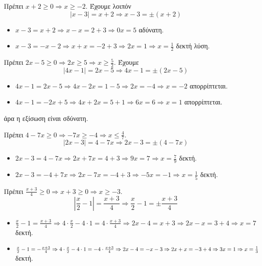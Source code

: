 \begin{alist}
\item Πρέπει $ x+2\geq 0\Rightarrow x\geq -2 $. Έχουμε λοιπόν 
\[ |x-3|=x+2\Rightarrow x-3=\pm(x+2) \]
\begin{itemize}
\item $ x-3=x+2\Rightarrow x-x=2+3\Rightarrow 0x=5 $ αδύνατη.
\item $ x-3=-x-2\Rightarrow x+x=-2+3\Rightarrow 2x=1\Rightarrow x=\frac{1}{2} $ δεκτή λύση.
\end{itemize}
\item Πρέπει $ 2x-5\geq 0\Rightarrow 2x\geq 5\Rightarrow x\geq \frac{5}{2} $. Έχουμε
\[ |4x-1|=2x-5\Rightarrow 4x-1=\pm(2x-5) \]
\begin{itemize}
\item $ 4x-1=2x-5\Rightarrow 4x-2x=1-5\Rightarrow 2x=-4\Rightarrow x=-2 $ απορρίπτεται.
\item $ 4x-1=-2x+5\Rightarrow 4x+2x=5+1\Rightarrow 6x=6\Rightarrow x=1 $ απορρίπτεται.
\end{itemize}
άρα η εξίσωση είναι σδύνατη.
\item Πρέπει $ 4-7x\geq 0\Rightarrow -7x\geq-4\Rightarrow x\leq\frac{4}{7} $.
\[ |2x-3|=4-7x\Rightarrow 2x-3=\pm(4-7x) \]
\begin{itemize}
\item $ 2x-3=4-7x\Rightarrow 2x+7x=4+3\Rightarrow 9x=7\Rightarrow x=\frac{7}{9} $ δεκτή.
\item $ 2x-3=-4+7x\Rightarrow 2x-7x=-4+3\Rightarrow -5x=-1\Rightarrow x=\frac{1}{5} $ δεκτή.
\end{itemize}
\item Πρέπει $ \frac{x+3}{4}\geq 0\Rightarrow x+3\geq 0\Rightarrow x\geq -3 $.
\[ \left|\frac{x}{2}-1\right|=\frac{x+3}{4}\Rightarrow \frac{x}{2}-1=\pm\frac{x+3}{4} \]
\begin{itemize}
\item $\frac{x}{2}-1=\frac{x+3}{4}\Rightarrow 4\cdot\frac{x}{2}-4\cdot 1=4\cdot\frac{x+3}{4}\Rightarrow 2x-4=x+3\Rightarrow 2x-x=3+4\Rightarrow x=7$ δεκτή.
\item $\frac{x}{2}-1=-\frac{x+3}{4}\Rightarrow 4\cdot\frac{x}{2}-4\cdot 1=-4\cdot\frac{x+3}{4}\Rightarrow 2x-4=-x-3\Rightarrow 2x+x=-3+4\Rightarrow\\ 3x=1\Rightarrow x=\frac{1}{3}$ δεκτή.
\end{itemize}
\end{alist}
